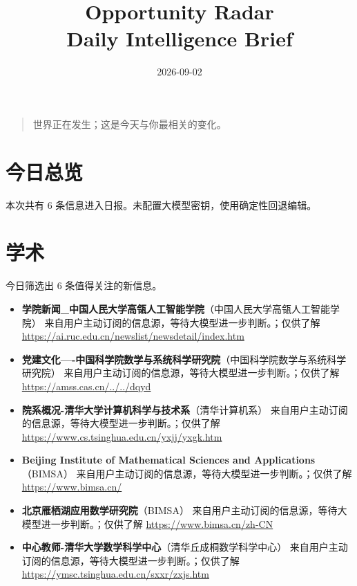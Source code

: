 \documentclass[11pt]{ctexart}
\title{Opportunity Radar\\Daily Intelligence Brief}
\date{2026-09-02}
\begin{document}
\maketitle
\begin{quote}\Large 世界正在发生；这是今天与你最相关的变化。\end{quote}
\section*{今日总览}
本次共有 6 条信息进入日报。未配置大模型密钥，使用确定性回退编辑。
\section*{学术}
今日筛选出 6 条值得关注的新信息。
\begin{itemize}
\item \textbf{学院新闻\_中国人民大学高瓴人工智能学院}（中国人民大学高瓴人工智能学院） 来自用户主动订阅的信息源，等待大模型进一步判断。；仅供了解 \url{https://ai.ruc.edu.cn/newslist/newsdetail/index.htm}
\item \textbf{党建文化----中国科学院数学与系统科学研究院}（中国科学院数学与系统科学研究院） 来自用户主动订阅的信息源，等待大模型进一步判断。；仅供了解 \url{https://amss.cas.cn/../../dqyd}
\item \textbf{院系概况-清华大学计算机科学与技术系}（清华计算机系） 来自用户主动订阅的信息源，等待大模型进一步判断。；仅供了解 \url{https://www.cs.tsinghua.edu.cn/yxjj/yxgk.htm}
\item \textbf{Beijing Institute of Mathematical Sciences and Applications}（BIMSA） 来自用户主动订阅的信息源，等待大模型进一步判断。；仅供了解 \url{https://www.bimsa.cn/}
\item \textbf{北京雁栖湖应用数学研究院}（BIMSA） 来自用户主动订阅的信息源，等待大模型进一步判断。；仅供了解 \url{https://www.bimsa.cn/zh-CN}
\item \textbf{中心教师-清华大学数学科学中心}（清华丘成桐数学科学中心） 来自用户主动订阅的信息源，等待大模型进一步判断。；仅供了解 \url{https://ymsc.tsinghua.edu.cn/sxxr/zxjs.htm}
\end{itemize}
\end{document}
